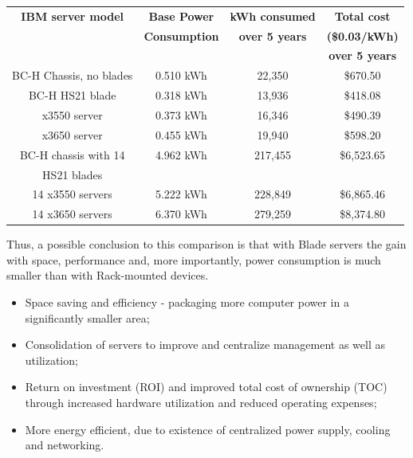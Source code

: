             \begin{table}
                \centering
                \begin{tabular}{|c|c|c|c|}
                \hline
                \multicolumn{ 1}{|c|}{{\bf IBM server model}} & \multicolumn{ 1}{|c|}{{\bf Base Power}} & \multicolumn{ 1}{|c|}{{\bf kWh consumed}} & \multicolumn{ 1}{|c|}{{\bf Total cost }} \\
                \multicolumn{ 1}{|c|}{{\bf }} & \multicolumn{ 1}{|c|}{{\bf Consumption}} & \multicolumn{ 1}{|c|}{{\bf over 5 years}} & \multicolumn{ 1}{|c|}{{\bf (\$0.03/kWh)}} \\
                \multicolumn{ 1}{|c|}{{\bf }} & \multicolumn{ 1}{|c|}{{\bf }} & \multicolumn{ 1}{|c|}{{\bf }} & \multicolumn{ 1}{|c|}{{\bf over 5 years}} \\
                \hline
                BC-H Chassis, no blades & 0.510 kWh &     22,350 &  \$670.50  \\
                \hline
                BC-H HS21 blade & 0.318 kWh &     13,936 &  \$418.08  \\
                \hline
                x3550 server & 0.373 kWh &     16,346 &  \$490.39  \\
                \hline
                x3650 server & 0.455 kWh &     19,940 &  \$598.20  \\
                \hline
                BC-H chassis with 14 & 4.962 kWh &    217,455 & \$6,523.65  \\
                HS21 blades &  &  &  \\
                \hline
                14 x3550 servers & 5.222 kWh &    228,849 & \$6,865.46  \\
                \hline
                14 x3650 servers & 6.370 kWh &    279,259 & \$8,374.80  \\
                \hline
                \end{tabular}  
                \label{tab:power_consumption_several_servers}
            \end{table}
            Thus, a possible conclusion to this comparison is that with Blade servers the gain with space, performance and, more importantly, power consumption is much smaller than with Rack-mounted devices.
            \begin{itemize}
                \item Space saving and efficiency - packaging more computer power in a significantly smaller area;
                \item Consolidation of servers to improve and centralize management as well as utilization;
                \item Return on investment (ROI) and improved total cost of ownership (TOC) through increased hardware utilization and reduced operating expenses;
                \item More energy efficient, due to existence of centralized power supply, cooling and networking.
            \end{itemize}
